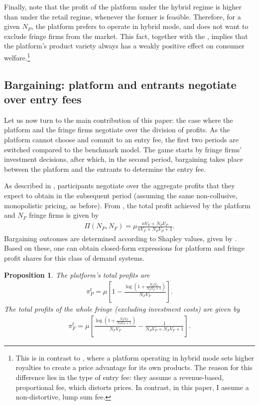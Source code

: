 \documentclass[a4paper]{article}
\newtheorem{proposition}{Proposition}
\begin{document}
Finally, note that the profit of the platform under the hybrid regime is higher than under the retail regime, whenever the former is feasible.
Therefore, for a given $N_P$, the platform prefers to operate in hybrid mode, and does not want to exclude fringe firms from the market.
This fact, together with the , implies that the platform's product variety always has a weakly positive effect on consumer welfare.\footnote{
    This is in contrast to \textcite{anderson2021hybrid}, where a platform operating in hybrid mode sets higher royalties to create a price advantage for its own products.
    The reason for this difference lies in the type of entry fee: they assume a revenue-based, proportional fee, which distorts prices.
    In contrast, in this paper, I assume a non-distortive, lump sum fee.
}

\subsection{Bargaining: platform and entrants negotiate over entry fees}

Let us now turn to the main contribution of this paper: the case where the platform and the fringe firms negotiate over the division of profits.
As the platform cannot choose and commit to an entry fee, the first two periods are switched compared to the benchmark model.
The game starts by fringe firms' investment decisions, after which, in the second period, bargaining takes place between the platform and the entrants to determine the entry fee.

As described in , participants negotiate over the aggregate profits that they expect to obtain in the subsequent period (assuming the same non-collusive, monopolistic pricing, as before).
From , the total profit achieved by the platform and $N_F$ fringe firms is given by
\begin{align*}
    \Pi(N_P, N_F) = \mu \frac{n V_F + N_P V_P}{n V_F + N_P V_P + 1}.
\end{align*}
Bargaining outcomes are determined according to Shapley values, given by .
Based on these, one can obtain closed-form expressions for platform and fringe profit shares for this class of demand systems.
\begin{proposition}
    \label{prop:platform_profits_bargaining}
    The platform's total profits are
    \begin{align*}
        \pi^t_P = \mu \left[ 1 - \frac{\log \left(1 + \frac{N_F V_F}{N_P V_P + 1} \right)}{N_F V_F} \right].
    \end{align*}
    The total profits of the whole fringe (excluding investment costs) are given by
    \begin{align*}
        \pi^t_F = \mu \left[ \frac{\log \left( 1 + \frac{N_F V_F}{N_P V_P + 1} \right)}{N_F V_F} - \frac{1}{N_P V_P + N_F V_F + 1} \right].
    \end{align*}
\end{proposition}
\end{document}

